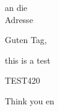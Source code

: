 \documentclass[11pt,twoside]{article}
\begin{document}
\begin{letter}{
an die \\
Adresse\\
}

\opening{Guten Tag,}

this is a test

TEST420\cite{gdpr}


\closing{Think you en}


\end{letter}
\end{document}
